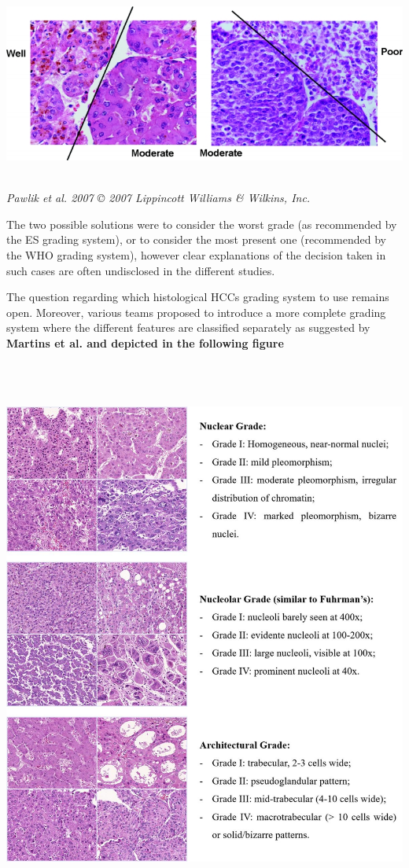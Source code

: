 \documentclass[]{article}
\begin{document}
\includegraphics[width=6.26772in,height=2.44444in]{./images/media/image6.jpg}

\emph{Pawlik et al. 2007 © 2007 Lippincott Williams \& Wilkins, Inc.}

The two possible solutions were to consider the worst grade (as
recommended by the ES grading system), or to consider the most present
one (recommended by the WHO grading system), however clear explanations
of the decision taken in such cases are often undisclosed in the
different studies.

The question regarding which histological HCCs grading system to use
remains open. Moreover, various teams proposed to introduce a more
complete grading system where the different features are classified
separately as suggested by \textbf{Martins et al. and depicted in the
following figure}

\includegraphics[width=6.26772in,height=7.20833in]{./images/media/image20.jpg}
\end{document}

